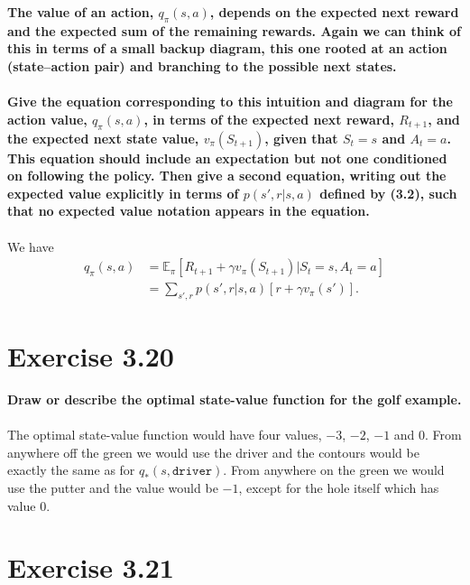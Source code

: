 \documentclass[a4paper,11pt]{article}
\numberwithin{equation}{section}
\theoremstyle{remark}
\newcommand{\E}{\mathbb E}
\begin{document}
\textbf{The value of an action, $q_\pi(s, a)$, depends on the expected next reward and the expected sum of the remaining rewards. Again we can think of this in terms of a small backup diagram, this one rooted at an action (state–action pair) and branching to the possible next states.
\\ \\
Give the equation corresponding to this intuition and diagram for the action value, $q_\pi(s, a)$, in terms of the expected next reward, $R_{t+1}$, and the expected next state value, $v_\pi(S_{t+1})$, given that $S_t =s$ and $A_t =a$. This equation should include an expectation but not one conditioned on following the policy. Then give a second equation, writing out the expected value explicitly in terms of $p(s', r|s, a)$ defined by (3.2), such that no expected value notation appears in the equation.}
\\ \\
We have 
\begin{align*}
	q_\pi(s, a) & = \E_\pi[R_{t+1} + \gamma v_\pi(S_{t+1}) | S_t = s, A_t = a] \\
			    & = \sum_{s', r} p(s', r | s, a)[r + \gamma v_\pi(s')].
\end{align*}

\section{Exercise 3.20}

\textbf{Draw or describe the optimal state-value function for the golf example.}
\\ \\
The optimal state-value function would have four values, $-3$, $-2$, $-1$ and $0$. From anywhere off the green we would use the driver and the contours would be exactly the same as for $q_*(s, \texttt{driver})$. From anywhere on the green we would use the putter and the value would be $-1$, except for the hole itself which has value $0$.


\section{Exercise 3.21}
\end{document}
